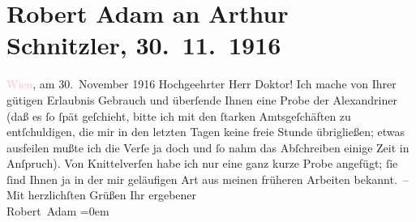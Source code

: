 

               \section[Robert Adam an Arthur Schnitzler, 30. 11. 1916]{ Robert Adam an Arthur Schnitzler, 30. 11. 1916}\nopagebreak{}\rehead{ }\normalsize\beginnumbering{} \toendnotes[C]{\smallbreak\pagebreak[2]} 
\pstart
           \raggedleft{}{\pb}\textcolor{pink}{Wien}{}\ledrightnote{\textcolor{pink}{Wien}}, am 30. November 1916\pend
           \pstart{}Hochgeehrter Herr Doktor!\pend\pstart
           Ich mache von Ihrer gütigen Erlaubnis Gebrauch und überſende Ihnen eine Probe der
                    Alexandriner (daß es ſo ſpät geſchieht, bitte ich mit den ſtarken Amtsgeſchäften
                    zu entſchuldigen, die mir in den letzten Tagen keine freie Stunde übrigließen;
                    etwas ausfeilen mußte ich die Verſe ja doch und ſo nahm das Abſchreiben einige
                    Zeit in Anſpruch). Von Knittelverſen habe ich nur eine ganz kurze Probe
                    angefügt; ſie ſind Ihnen ja in der mir geläufi{\pb}gen Art aus meinen früheren Arbeiten bekannt. –\pend
           \pstart
           Mit herzlichſten Grüßen Ihr\pend
           \pstart
           ergebener{\\[\baselineskip]}\spacefill\mbox{Robert Adam}\pend
           \leftskip=0em{}\endnumbering{}  
      